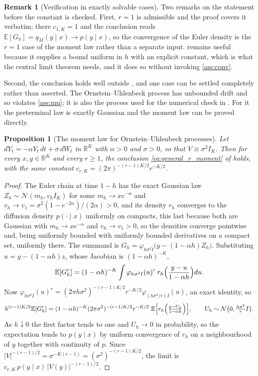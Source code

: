 \documentclass[11pt]{article}
\newtheorem{proposition}[proposition]{Proposition}
\theoremstyle{definition}
\newtheorem{remark}[remark]{Remark}
\newcommand{\R}{\mathbb{R}}
\newcommand{\E}{\mathbb{E}}
\newcommand{\Normal}{\mathcal{N}}
\begin{document}
\begin{remark}[Verification in exactly solvable cases]\label{rem:verification}
Two remarks on the statement before the constant is checked. First, $r=1$ is admissible and the proof covers it verbatim; there $c_{1,K}=1$ and the conclusion reads $\E[G_h]=q_M(y\mid x)\to p(y\mid x)$, so the convergence of the Euler density is the $r=1$ case of the moment law rather than a separate input.  remains useful because it supplies a bound uniform in $h$ with an explicit constant, which is what the central limit theorem needs, and it does so without invoking \ref{ass:conv}.

Second, the conclusion holds well outside , and one case can be settled completely rather than asserted. The Ornstein--Uhlenbeck process has unbounded drift and so violates \ref{ass:mu}; it is also the process used for the numerical check in . For it the preterminal law is exactly Gaussian and the moment law can be proved directly.

\begin{proposition}[The moment law for Ornstein--Uhlenbeck processes]\label{prop:ou_moment}
Let $dY_t=-\alpha Y_t\,dt+\sigma\,dW_t$ in $\R^K$ with $\alpha>0$ and $\sigma>0$, so that $V\equiv\sigma^2I_K$. Then for every $x,y\in\R^K$ and every $r\ge1$, the conclusion \eqref{eq:general_r_moment} of  holds, with the same constant $c_{r,K}=(2\pi)^{-(r-1)K/2}r^{-K/2}$.
\end{proposition}

\begin{proof}
The Euler chain at time $1-h$ has the exact Gaussian law $Z_h\sim\Normal(m_h,v_hI_K)$ for some $m_h\to xe^{-\alpha}$ and $v_h\to v_1=\sigma^2(1-e^{-2\alpha})/(2\alpha)>0$, and its density $r_h$ converges to the diffusion density $p(\cdot\mid x)$ uniformly on compacts, this last because both are Gaussian with $m_h\to xe^{-\alpha}$ and $v_h\to v_1>0$, so the densities converge pointwise and, being uniformly bounded with uniformly bounded derivatives on a compact set, uniformly there. The summand is $G_h=\varphi_{h\sigma^2I}\bigl(y-(1-\alpha h)Z_h\bigr)$. Substituting $u=y-(1-\alpha h)z$, whose Jacobian is $(1-\alpha h)^{-K}$,
\[
\E[G_h^r]=(1-\alpha h)^{-K}\int\varphi_{h\sigma^2I}(u)^r\,r_h\Bigl(\frac{y-u}{1-\alpha h}\Bigr)du .
\]
Now $\varphi_{h\sigma^2I}(u)^r=(2\pi h\sigma^2)^{-(r-1)K/2}r^{-K/2}\varphi_{(h\sigma^2/r)I}(u)$, an exact identity, so
\[
h^{(r-1)K/2}\E[G_h^r]
=(1-\alpha h)^{-K}(2\pi\sigma^2)^{-(r-1)K/2}r^{-K/2}\;
\E\Bigl[r_h\Bigl(\tfrac{y-U_h}{1-\alpha h}\Bigr)\Bigr],
\qquad U_h\sim\Normal\bigl(0,\tfrac{h\sigma^2}{r}I\bigr).
\]
As $h\downarrow0$ the first factor tends to one and $U_h\to0$ in probability, so the expectation tends to $p(y\mid x)$ by uniform convergence of $r_h$ on a neighbourhood of $y$ together with continuity of $p$. Since $|V|^{-(r-1)/2}=\sigma^{-K(r-1)}=(\sigma^2)^{-(r-1)K/2}$, the limit is $c_{r,K}\,p(y\mid x)\,|V(y)|^{-(r-1)/2}$.
\end{proof}


\end{remark}
\end{document}
